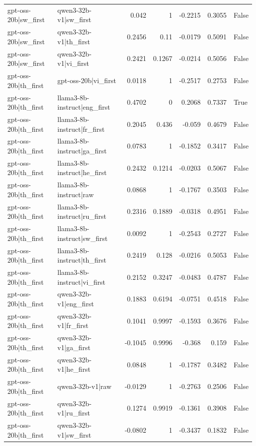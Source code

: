 \begin{table}
\begin{tabular}{l l r r r r l}
gpt-oss-20b|sw_first & qwen3-32b-v1|sw_first & 0.042 & 1 & -0.2215 & 0.3055 & False \\
gpt-oss-20b|sw_first & qwen3-32b-v1|th_first & 0.2456 & 0.11 & -0.0179 & 0.5091 & False \\
gpt-oss-20b|sw_first & qwen3-32b-v1|vi_first & 0.2421 & 0.1267 & -0.0214 & 0.5056 & False \\
gpt-oss-20b|th_first & gpt-oss-20b|vi_first & 0.0118 & 1 & -0.2517 & 0.2753 & False \\
gpt-oss-20b|th_first & llama3-8b-instruct|eng_first & 0.4702 & 0 & 0.2068 & 0.7337 & True \\
gpt-oss-20b|th_first & llama3-8b-instruct|fr_first & 0.2045 & 0.436 & -0.059 & 0.4679 & False \\
gpt-oss-20b|th_first & llama3-8b-instruct|ga_first & 0.0783 & 1 & -0.1852 & 0.3417 & False \\
gpt-oss-20b|th_first & llama3-8b-instruct|he_first & 0.2432 & 0.1214 & -0.0203 & 0.5067 & False \\
gpt-oss-20b|th_first & llama3-8b-instruct|raw & 0.0868 & 1 & -0.1767 & 0.3503 & False \\
gpt-oss-20b|th_first & llama3-8b-instruct|ru_first & 0.2316 & 0.1889 & -0.0318 & 0.4951 & False \\
gpt-oss-20b|th_first & llama3-8b-instruct|sw_first & 0.0092 & 1 & -0.2543 & 0.2727 & False \\
gpt-oss-20b|th_first & llama3-8b-instruct|th_first & 0.2419 & 0.128 & -0.0216 & 0.5053 & False \\
gpt-oss-20b|th_first & llama3-8b-instruct|vi_first & 0.2152 & 0.3247 & -0.0483 & 0.4787 & False \\
gpt-oss-20b|th_first & qwen3-32b-v1|eng_first & 0.1883 & 0.6194 & -0.0751 & 0.4518 & False \\
gpt-oss-20b|th_first & qwen3-32b-v1|fr_first & 0.1041 & 0.9997 & -0.1593 & 0.3676 & False \\
gpt-oss-20b|th_first & qwen3-32b-v1|ga_first & -0.1045 & 0.9996 & -0.368 & 0.159 & False \\
gpt-oss-20b|th_first & qwen3-32b-v1|he_first & 0.0848 & 1 & -0.1787 & 0.3482 & False \\
gpt-oss-20b|th_first & qwen3-32b-v1|raw & -0.0129 & 1 & -0.2763 & 0.2506 & False \\
gpt-oss-20b|th_first & qwen3-32b-v1|ru_first & 0.1274 & 0.9919 & -0.1361 & 0.3908 & False \\
gpt-oss-20b|th_first & qwen3-32b-v1|sw_first & -0.0802 & 1 & -0.3437 & 0.1832 & False \\

\end{tabular}
\end{table}
